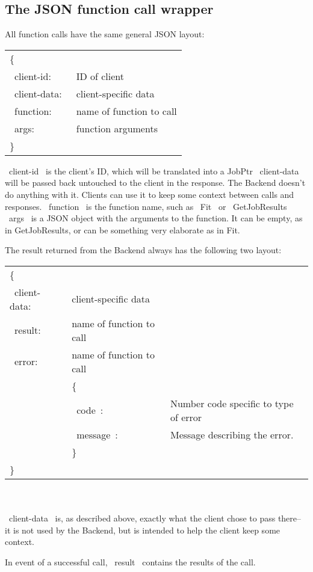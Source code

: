 \documentclass[12pt]{article}
\begin{document}
\subsection{The JSON function call wrapper}
All function calls have the same general JSON layout:

	\begin{tabular}{l l}
	
		\{ \\
		~client-id:~ & ID of client \\
		~client-data:~ &  client-specific data\\ 
		~function:~ & name of function to call\\ 
		~args:~ & function arguments\\
		\} 
	\end{tabular} 
	
~client-id~ is the client's ID, which will be translated into a JobPtr
~client-data~ will be passed back untouched to the client in the response. The Backend doesn't do anything with it. Clients can use it to keep some context between calls and responses. 
~function~ is the function name, such as ~Fit~ or ~GetJobResults~
~args~ is a JSON object with the arguments to the function. It can be empty, as in GetJobResults, or can be something very elaborate as in Fit.

The result returned from the Backend always has the following two layout:
\\

	\begin{tabular}{l l l}
		\{ \\
		~client-data:~ &  client-specific data & \\ 
		~result:~ & name of function to call & \\ 
		~error:~ & name of function to call &\\ 
		&	\{\\
		& ~code~: & Number code specific to type of error\\
		& ~message~: & Message describing the error.\\
		&	\} \\
		\}
	\end{tabular} 
\\
\\
	
~client-data~ is, as described above, exactly what the client chose to pass there-- it is not used by the Backend, but is intended to help the client keep some context.

In event of a successful call, ~result~ contains the results of the call.
\end{document}
